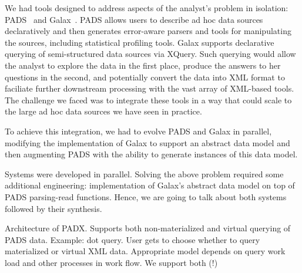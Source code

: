 
We had tools designed to address aspects of the analyst's problem in
isolation: PADS~\cite{pldi05} and Galax~\cite{galax}.  PADS allows
users to describe ad hoc data sources declaratively and then generates
error-aware parsers and tools for manipulating the sources, including
statistical profiling tools.  Galax supports declarative querying of
semi-structured data sources via XQuery.  Such querying would allow
the analyst to explore the data in the first place, produce the
answers to her questions in the second, and potentially convert the
data into XML format to faciliate further downstream processing with
the vast array of XML-based tools.  The challenge we faced was to
integrate these tools in a way that could scale to the large ad hoc
data sources we have seen in practice.  

To achieve this integration, we had to evolve PADS and Galax in
parallel, modifying the implementation of Galax to support an abstract
data model and then augmenting PADS with the ability to generate
instances of this data model.  



Systems were developed in parallel.  Solving the above problem
required some additional engineering: implementation of Galax's
abstract data model on top of PADS parsing-read functions.  
Hence, we are going to talk about both systems followed by their
synthesis. 

Architecture of PADX.  Supports both non-materialized and virtual
querying of PADS data.  Example: dot query.  User gets to choose
whether to query materialized or virtual XML data.  Appropriate model
depends on query work load and other processes in work flow.  We
support both (!)


